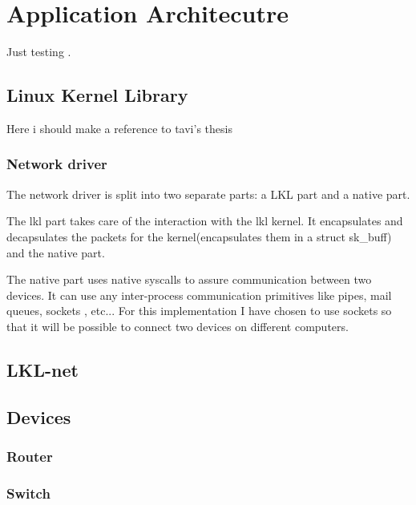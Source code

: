 \chapter{Application Architecutre}
\label{chapter:arch}

Just testing \cite{linnetarch}.

\section{Linux Kernel Library}
Here i should make a reference to tavi's thesis\cite{thesis}
\label{sec:lkl}

\subsection{Network driver}
\label{sec:net-driver}

The network driver is split into two separate parts: a LKL part and a native part.

The lkl part takes care of the interaction with the lkl kernel. It encapsulates
and decapsulates the packets for the kernel(encapsulates them in a struct sk_buff)
and the native part.

The native part uses native syscalls to assure communication between two devices.
It can use any inter-process communication primitives like pipes, mail queues, sockets
, etc... For this implementation I have chosen to use sockets so that it will be possible
to connect two devices on different computers.


\section{LKL-net}
\label{sec:lkl-net}


\section{Devices}
\label{sec:devices}

\subsection{Router}
\label{sub-sec:router}

\subsection{Switch}
\label{sub-sec:switch}

